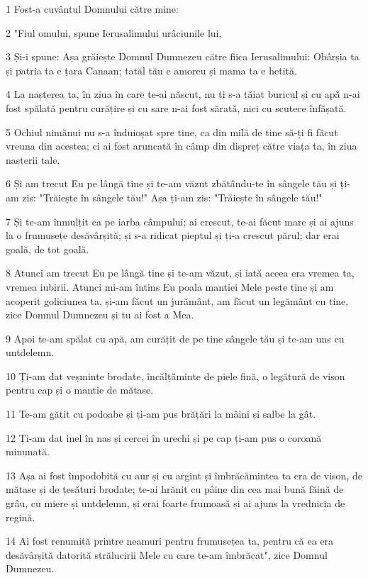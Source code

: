 \par 1 Fost-a cuvântul Domnului către mine:
\par 2 "Fiul omului, spune Ierusalimului urâciunile lui,
\par 3 Și-i spune: Așa grăiește Domnul Dumnezeu către fiica Ierusalimului: Obârșia ta și patria ta e țara Canaan; tatăl tău e amoreu și mama ta e hetită.
\par 4 La nașterea ta, în ziua în care te-ai născut, nu ti s-a tăiat buricul și cu apă n-ai fost spălată pentru curățire și cu sare n-ai fost sărată, nici cu scutece înfășată.
\par 5 Ochiul nimănui nu s-a înduioșat spre tine, ca din milă de tine să-ți fi făcut vreuna din acestea; ci ai fost aruncată în câmp din dispreț către viața ta, în ziua nașterii tale.
\par 6 Și am trecut Eu pe lângă tine și te-am văzut zbătându-te în sângele tău și ți-am zis: "Trăiește în sângele tău!" Așa ți-am zis: "Trăiește în sângele tău!"
\par 7 Și te-am înmulțit ca pe iarba câmpului; ai crescut, te-ai făcut mare și ai ajuns la o frumusețe desăvârșită; și s-a ridicat pieptul și ți-a crescut părul; dar erai goală, de tot goală.
\par 8 Atunci am trecut Eu pe lângă tine și te-am văzut, și iată aceea era vremea ta, vremea iubirii. Atunci mi-am întins Eu poala mantiei Mele peste tine și am acoperit goliciunea ta, și-am făcut un jurământ, am făcut un legământ cu tine, zice Domnul Dumnezeu și tu ai fost a Mea.
\par 9 Apoi te-am spălat cu apă, am curățit de pe tine sângele tău și te-am uns cu untdelemn.
\par 10 Ți-am dat veșminte brodate, încălțăminte de piele fină, o legătură de vison pentru cap și o mantie de mătase.
\par 11 Te-am gătit cu podoabe și ți-am pus brățări la mâini și salbe la gât.
\par 12 Ți-am dat inel în nas și cercei în urechi și pe cap ți-am pus o coroană minunată.
\par 13 Așa ai fost împodobită cu aur și cu argint și îmbrăcămintea ta era de vison, de mătase și de țesături brodate; te-ai hrănit cu pâine din cea mai bună făină de grâu, cu miere și untdelemn, și erai foarte frumoasă și ai ajuns la vrednicia de regină.
\par 14 Ai fost renumită printre neamuri pentru frumusețea ta, pentru că ea era desăvârșită datorită strălucirii Mele cu care te-am îmbrăcat", zice Domnul Dumnezeu.
